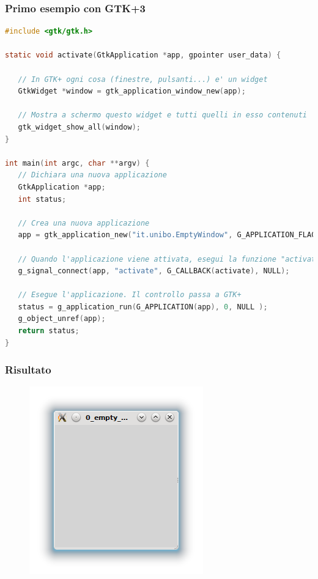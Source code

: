 \documentclass{beamer}
\begin{document}
\begin{frame}[fragile]
\frametitle{Primo esempio con GTK+3}
\scriptsize
\begin{lstlisting}[language=C]
#include <gtk/gtk.h>

static void activate(GtkApplication *app, gpointer user_data) {

   // In GTK+ ogni cosa (finestre, pulsanti...) e' un widget 
   GtkWidget *window = gtk_application_window_new(app);

   // Mostra a schermo questo widget e tutti quelli in esso contenuti
   gtk_widget_show_all(window);
}

int main(int argc, char **argv) {
   // Dichiara una nuova applicazione
   GtkApplication *app;
   int status;

   // Crea una nuova applicazione
   app = gtk_application_new("it.unibo.EmptyWindow", G_APPLICATION_FLAGS_NONE);

   // Quando l'applicazione viene attivata, esegui la funzione "activate"
   g_signal_connect(app, "activate", G_CALLBACK(activate), NULL);
   
   // Esegue l'applicazione. Il controllo passa a GTK+
   status = g_application_run(G_APPLICATION(app), 0, NULL );
   g_object_unref(app);
   return status;
}
\end{lstlisting} 
\end{frame}

\begin{frame}
\frametitle{Risultato}
\begin{figure}
 \includegraphics[width=0.6\columnwidth]{img/0}
\end{figure}
\end{frame}
\end{document}
